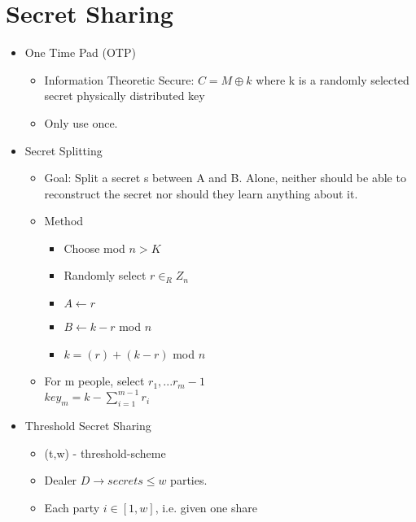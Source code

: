 \section{Secret Sharing}
\begin{itemize}
\item One Time Pad (OTP)
    \begin{itemize}
    \item Information Theoretic Secure: $C = M \oplus k$ where k is a randomly selected secret physically distributed key
    \item Only use once.
    \end{itemize}
\item Secret Splitting
    \begin{itemize}
    \item Goal: Split a secret s between A and B. Alone, neither should be able to reconstruct the secret nor should they learn anything about it.
    \item Method
        \begin{itemize}
        \item Choose mod $n > K$
        \item Randomly select $r \in_R Z_n$
        \item $A \leftarrow r$
        \item $B \leftarrow k-r$ mod $n$
        \item $k = (r) + (k-r)$ mod $n$
        \end{itemize}
    \item For m people, select $r_1, ... r_m-1$
        \\$key_m = k - \sum_{i=1}^{m-1} r_i$
    \end{itemize}
\item Threshold Secret Sharing
    \begin{itemize}
    \item (t,w) - threshold-scheme
    \item Dealer $D \rightarrow secrets \le w$ parties.
    \item Each party $i \in [1,w]$, i.e. given one share
    \end{itemize}
\end{itemize}